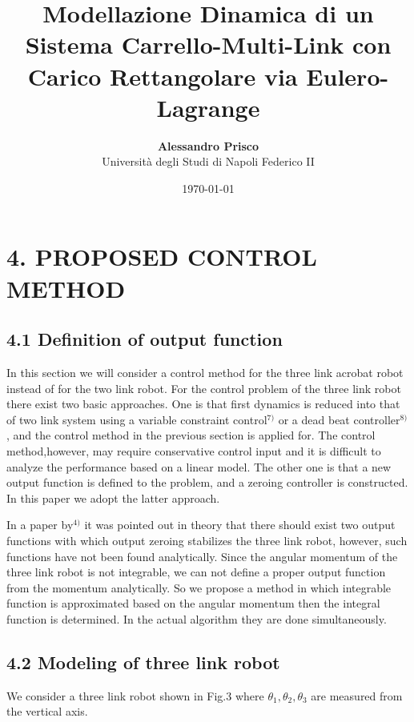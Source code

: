 \documentclass[11pt,a4paper]{article}
\title{\textbf{Modellazione Dinamica di un Sistema Carrello-Multi-Link con Carico Rettangolare via Eulero-Lagrange}}
\author{\textbf{Alessandro Prisco} \\ Università degli Studi di Napoli Federico II}
\date{\today}
\begin{document}
	
\section*{4. PROPOSED CONTROL METHOD}

\subsection*{4.1 Definition of output function}

In this section we will consider a control method for the three link acrobat robot instead of for the two link robot. For the control problem of the three link robot there exist two basic approaches. One is that first dynamics is reduced into that of two link system using a variable constraint control$^{7)}$ or a dead beat controller$^{8)}$, and the control method in the previous section is applied for. The control method,however, may require conservative control input and it is difficult to analyze the performance based on a linear model. The other one is that a new output function is defined to the problem, and a zeroing controller is constructed. In this paper we adopt the latter approach.

In a paper by$^{4)}$ it was pointed out in theory that there should exist two output functions with which output zeroing stabilizes the three link robot, however, such functions have not been found analytically. Since the angular momentum of the three link robot is not integrable, we can not define a proper output function from the momentum analytically. So we propose a method in which integrable function is approximated based on the angular momentum then the integral function is determined. In the actual algorithm they are done simultaneously.
	\subsection*{4.2 Modeling of three link robot}
	
	We consider a three link robot shown in Fig.3 where $\theta_1, \theta_2, \theta_3$ are measured from the vertical axis.
	
\end{document}
